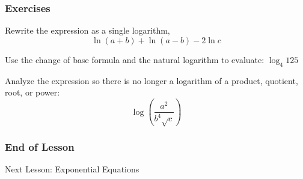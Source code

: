 \documentclass[xcolor=dvipsnames]{beamer}
\begin{document}
\begin{frame}
  \frametitle{Exercises}
{\ubung} Rewrite the expression as a single logarithm,
\begin{equation}
  \label{eq:zahshaum}
\ln(a+b)+\ln(a-b)-2\ln{}c
\end{equation}

{\ubung} Use the change of base formula and the natural logarithm to
evaluate: $\log_{4}125$

{\ubung} Analyze the expression so there is no longer a logarithm of a
product, quotient, root, or power: 
\begin{equation}
  \label{eq:ooreyonu}
  \log\left(\frac{a^{2}}{b^{4}\sqrt{c}}\right)
\end{equation}
\end{frame}

\begin{frame}
  \frametitle{End of Lesson}
Next Lesson: Exponential Equations
\end{frame}
\end{document}
